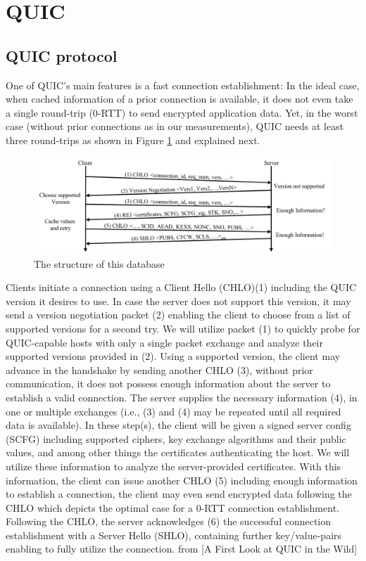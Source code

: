 \documentclass[a4paper, 10pt]{article}
\begin{document}
\section{QUIC}
\subsection{QUIC protocol}

One of QUIC’s main features is a fast connection establishment: In the ideal case,  when cached information of a prior connection is available, it does not even take a single  round-trip (0-RTT) to send encrypted application data. Yet, in the worst case (without  prior connections as in our measurements), QUIC needs at least three round-trips as  shown in Figure \ref{fig:quic1} and explained next.


\begin{figure}[ht]
	\centering
	\begin{minipage}{0.8\textwidth}%
		\includegraphics[width=500pt]{quic1.png}
		\caption{The structure of this database}
		\label{fig:quic1}
	\end{minipage}
\end{figure}

Clients initiate a connection using a Client Hello (CHLO)(1) including the QUIC  version it desires to use. In case the server does not support this version, it may send  a version negotiation packet (2) enabling the client to choose from a list of supported  versions for a second try. We will utilize packet (1) to quickly probe for QUIC-capable  hosts with only a single packet exchange and analyze their supported versions provided  in (2). Using a supported version, the client may advance in the handshake by sending  another CHLO (3), without prior communication, it does not possess enough information  about the server to establish a valid connection. The server supplies the necessary  information (4), in one or multiple exchanges (i.e., (3) and (4) may be repeated until all  required data is available). In these step(s), the client will be given a signed server config  (SCFG) including supported ciphers, key exchange algorithms and their public values,  and among other things the certificates authenticating the host. We will utilize these  information to analyze the server-provided certificates. With this information, the client  can issue another CHLO (5) including enough information to establish a connection, the  client may even send encrypted data following the CHLO which depicts the optimal case  for a 0-RTT connection establishment. Following the CHLO, the server acknowledges (6)  the successful connection establishment with a Server Hello (SHLO), containing further  key/value-pairs enabling to fully utilize the connection. from [A First Look at QUIC in the Wild]
\end{document}

